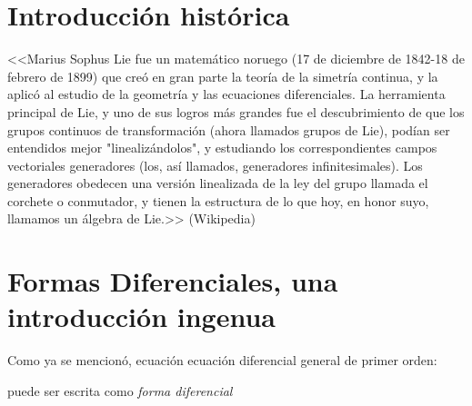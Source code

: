 


\section{Introducción histórica}





<<Marius Sophus Lie fue un matemático noruego (17 de diciembre de 1842-18 de febrero de 1899) que creó en gran parte la teoría de la simetría continua, y la aplicó al estudio de la geometría y las ecuaciones diferenciales.
La herramienta principal de Lie, y uno de sus logros más grandes fue el descubrimiento de que los grupos continuos de transformación (ahora llamados grupos de Lie), podían ser
 entendidos mejor "linealizándolos", y estudiando los correspondientes campos vectoriales generadores (los, así llamados, generadores infinitesimales).
Los generadores obedecen una versión linealizada de la ley del grupo llamada el corchete o conmutador, y tienen la estructura de lo que hoy, en honor suyo, llamamos un álgebra de Lie.>> (Wikipedia)





\section{Formas Diferenciales, una introducción ingenua}

Como ya se mencionó, ecuación ecuación diferencial general de primer orden:

puede ser escrita como \emph{forma diferencial}

